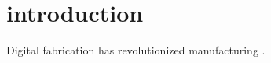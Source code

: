 \chapter{introduction}
\label{ch:introduction}

Digital fabrication has revolutionized manufacturing \cite{gershenfeld2007fab}.
